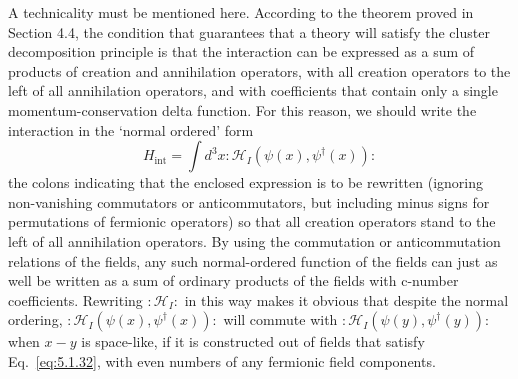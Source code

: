 A technicality must be mentioned here. According to the theorem proved in
Section 4.4, the condition that guarantees that a theory will satisfy the
cluster decomposition principle is that the interaction can be expressed as a
sum of products of creation and annihilation operators, with all creation
operators to the left of all annihilation operators, and with coefficients
that contain only a single momentum-conservation delta function. For this
reason, we should write the interaction in the `normal ordered' form
\begin{equation}
  H_{\mathrm{int}}=\int d^3x:\!\mathcal{H}_I
  (\psi(x),\psi^\dagger(x))\!:
  \tag{5.1.35}\label{eq:5.1.35}
\end{equation}
the colons indicating that the enclosed expression is to be rewritten
(ignoring non-vanishing commutators or anticommutators, but including minus
signs for permutations of fermionic operators) so that all creation operators
stand to the left of all annihilation operators. By using the commutation or
anticommutation relations of the fields, any such normal-ordered function of
the fields can just as well be written as a sum of ordinary products of the
fields with c-number coefficients. Rewriting
$:\!\mathcal{H}_I\!:$ in this way makes it obvious that despite the normal
ordering, $:\!\mathcal{H}_I(\psi(x),\psi^\dagger(x))\!:$ will commute with
$:\!\mathcal{H}_I(\psi(y),\psi^\dagger(y))\!:$ when $x-y$ is space-like,
if it is constructed out of fields that satisfy Eq.~\eqref{eq:5.1.32}, with even numbers
of any fermionic field components.
